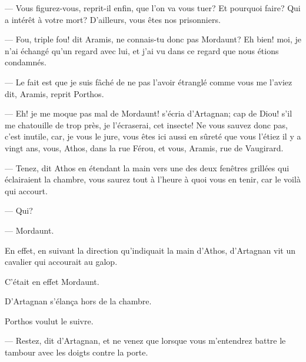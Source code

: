 — Vous figurez-vous, reprit-il enfin, que l'on va vous tuer? Et pourquoi faire? Qui a intérêt à votre mort? D'ailleurs, vous êtes nos prisonniers.

— Fou, triple fou! dit Aramis, ne connais-tu donc pas Mordaunt? Eh bien! moi, je n'ai échangé qu'un regard avec lui, et j'ai vu dans ce regard que nous étions condamnés.

— Le fait est que je suis fâché de ne pas l'avoir étranglé comme vous me l'aviez dit, Aramis, reprit Porthos.

— Eh! je me moque pas mal de Mordaunt! s'écria d'Artagnan; cap de Diou! s'il me chatouille de trop près, je l'écraserai, cet insecte! Ne vous sauvez donc pas, c'est inutile, car, je vous le jure, vous êtes ici aussi en sûreté que vous l'étiez il y a vingt ans, vous, Athos, dans la rue Férou, et vous, Aramis, rue de Vaugirard.

— Tenez, dit Athos en étendant la main vers une des deux fenêtres grillées qui éclairaient la chambre, vous saurez tout à l'heure à quoi vous en tenir, car le voilà qui accourt.

— Qui?

— Mordaunt.

En effet, en suivant la direction qu'indiquait la main d'Athos, d'Artagnan vit un cavalier qui accourait au galop.

C'était en effet Mordaunt.

D'Artagnan s'élança hors de la chambre.

Porthos voulut le suivre.

— Restez, dit d'Artagnan, et ne venez que lorsque vous m'entendrez battre le tambour avec les doigts contre la porte.